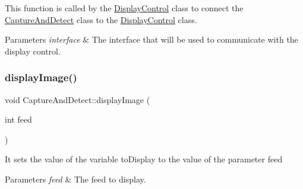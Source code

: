 This function is called by the \hyperlink{classGestro_1_1DisplayControl}{Display\+Control} class to connect the \hyperlink{classGestro_1_1CaptureAndDetect}{Capture\+And\+Detect} class to the \hyperlink{classGestro_1_1DisplayControl}{Display\+Control} class.


\begin{DoxyParams}{Parameters}
{\em interface} & The interface that will be used to communicate with the display control. \\
\hline
\end{DoxyParams}
\mbox{\label{classGestro_1_1CaptureAndDetect_a3f1ba69514a2debbc6b2a03e76f31b65}} 
\subsubsection{\texorpdfstring{display\+Image()}{displayImage()}}
{\footnotesize\ttfamily void Capture\+And\+Detect\+::display\+Image (\begin{DoxyParamCaption}\item[{int}]{feed }\end{DoxyParamCaption})}

It sets the value of the variable to\+Display to the value of the parameter feed


\begin{DoxyParams}{Parameters}
{\em feed} & The feed to display. \\
\hline
\end{DoxyParams}
\mbox{\label{classGestro_1_1CaptureAndDetect_a1df110dc696cebc95eb5d7ead2d74447}} 
